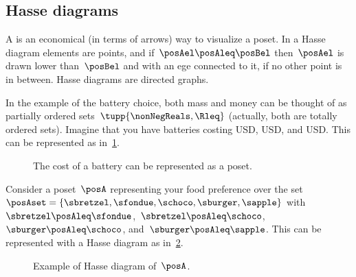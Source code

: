 \subsection{Hasse diagrams}

A \emph{} is an economical (in terms of arrows) way to visualize a poset.
In a Hasse diagram elements are points, and if~$\posAel \posAleq \posBel$ then~$\posAel$ is drawn lower than~$\posBel$ and with an ege connected to it, if no other point is in between.
Hasse diagrams are directed graphs.


In the example of the battery choice, both mass and money can be thought of as partially ordered sets~$\tupp{\nonNegReals,\Rleq}$ (actually, both are totally ordered sets).
Imagine that you have batteries costing \unit[10]{USD}, \unit[20]{USD}, and \unit[30]{USD}.
This can be represented as in~\cref{fig:hassebattery}.

\begin{figure}[h!]
    \centering
    \caption{The cost of a battery can be represented as a poset.}
    \label{fig:hassebattery}
\end{figure}



\begin{example}
    Consider a poset~$\posA$ representing your food preference over the set~$\posAset=\{\sbretzel,\sfondue,\schoco,\sburger,\sapple\}$ with~$\sbretzel\posAleq \sfondue$,~$\sbretzel\posAleq \schoco$,~$\sburger\posAleq \schoco$, and~$\sburger\posAleq \sapple$.
    This can be represented with a Hasse diagram as in~\cref{fig:hasse}.
\end{example}


\begin{figure}[h!]
    \centering
    \caption{Example of Hasse diagram of~$\posA$.}
    \label{fig:hasse}
\end{figure}


\begin{marginfigure}
    \centering
    \caption{}
    \label{fig:boolean}
\end{marginfigure}

